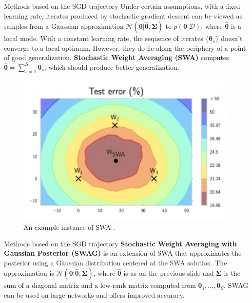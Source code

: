 \documentclass{beamer}
\begin{document}
\begin{frame}{Methods based on the SGD trajectory}
    Under certain assumptions, with a fixed learning rate, iterates produced by stochastic gradient descent can be viewed as samples from a Gaussian approximation $\mathcal{N}(\boldsymbol{\theta} | \hat{\boldsymbol{\theta}}, \boldsymbol{\Sigma})$ to $p(\boldsymbol{\theta} | \mathcal{D})$, where $\hat{\boldsymbol{\theta}}$ is a local mode. With a constant learning rate, the sequence of iterates $\{\boldsymbol{\theta}_s\}$ doesn't converge to a local optimum. However, they do lie along the periphery of a point of good generalization. \textbf{Stochastic Weight Averaging (SWA)} computes $\bar{\boldsymbol{\theta}} = \sum_{s = 1}^S \boldsymbol{\theta}_s$, which should produce better generalization.
    
    \begin{figure}
        \centering
        \includegraphics[scale=0.5]{stochastic_weight_averaging}
        \caption{An example instance of SWA \cite{pml2Book}.}
        \label{fig:stochastic_weight_averaging}
    \end{figure}
\end{frame}

\begin{frame}{Methods based on the SGD trajectory}
    \textbf{Stochastic Weight Averaging with Gaussian Posterior (SWAG)} is an extension of SWA that approximates the posterior using a Gaussian distribution centered at the SWA solution. The approximation is $\mathcal{N}(\boldsymbol{\theta} | \hat{\boldsymbol{\theta}}, \boldsymbol{\Sigma})$, where $\hat{\boldsymbol{\theta}}$ is as on the previous slide and $\boldsymbol{\Sigma}$ is the sum of a diagonal matrix and a low-rank matrix computed from $\boldsymbol{\theta}_1, \ldots, \boldsymbol{\theta}_S$. SWAG can be used on large networks and offers improved accuracy.
\end{frame}
\end{document}
